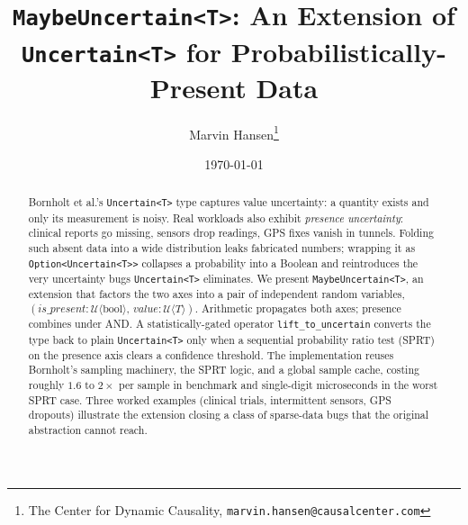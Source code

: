 \documentclass[11pt,a4paper]{article}
\title{\texttt{MaybeUncertain<T>}: An Extension of \texttt{Uncertain<T>} for Probabilistically-Present Data}
\author{Marvin Hansen\thanks{The Center for Dynamic Causality, \texttt{marvin.hansen@causalcenter.com}}}
\date{\today}
\newcommand{\Utype}{\mathcal{U}}
\newcommand{\Bool}{\mathrm{bool}}
\begin{document}
\maketitle

\begin{abstract}
Bornholt et al.'s \texttt{Uncertain<T>} type captures value uncertainty: a quantity exists and only its measurement is noisy. Real workloads also exhibit \emph{presence uncertainty}: clinical reports go missing, sensors drop readings, GPS fixes vanish in tunnels. Folding such absent data into a wide distribution leaks fabricated numbers; wrapping it as \texttt{Option<Uncertain<T>>} collapses a probability into a Boolean and reintroduces the very uncertainty bugs \texttt{Uncertain<T>} eliminates. We present \texttt{MaybeUncertain<T>}, an extension that factors the two axes into a pair of independent random variables, $(\mathit{is\_present}: \Utype\langle \Bool \rangle,\, \mathit{value}: \Utype\langle T \rangle)$. Arithmetic propagates both axes; presence combines under AND. A statistically-gated operator \texttt{lift\_to\_uncertain} converts the type back to plain \texttt{Uncertain<T>} only when a sequential probability ratio test (SPRT) on the presence axis clears a confidence threshold. The implementation reuses Bornholt's sampling machinery, the SPRT logic, and a global sample cache, costing roughly $1.6$ to $2\times$ per sample in benchmark and single-digit microseconds in the worst SPRT case. Three worked examples (clinical trials, intermittent sensors, GPS dropouts) illustrate the extension closing a class of sparse-data bugs that the original abstraction cannot reach.
\end{abstract}













\end{document}
